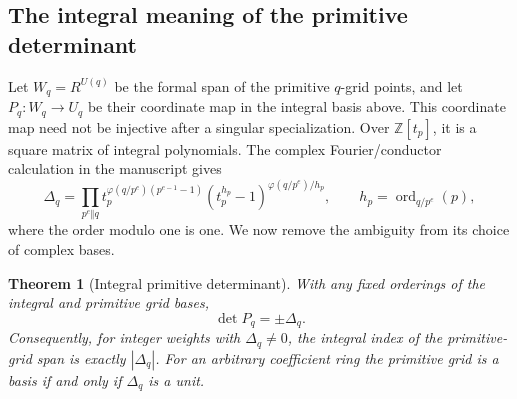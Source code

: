\documentclass[11pt,a4paper]{article}
\numberwithin{equation}{section}
\theoremstyle{plain}
\newtheorem{theorem}{Theorem}[section]
\theoremstyle{definition}
\theoremstyle{remark}
\begin{document}
\subsection{The integral meaning of the primitive determinant}

Let $W_q=R^{U(q)}$ be the formal span of the primitive $q$-grid points,
and let $P_q:W_q\to U_q$ be their coordinate map in the integral basis
above. This coordinate map need not be injective after a singular
specialization. Over $\mathbb Z[t_p]$, it is a square matrix of integral
polynomials. The complex Fourier/conductor calculation in the
manuscript gives
\[
 \Delta_q=\prod_{p^e\Vert q}
 t_p^{\varphi(q/p^e)(p^{e-1}-1)}
 (t_p^{h_p}-1)^{\varphi(q/p^e)/h_p},
 \qquad h_p=\operatorname{ord}_{q/p^e}(p),
\]
where the order modulo one is one. We now remove the ambiguity from
its choice of complex bases.

\begin{theorem}[Integral primitive determinant]
\label{intdist:thm:determinant}
With any fixed orderings of the integral and primitive grid bases,
\begin{equation}\label{intdist:eq:determinant}
 \det P_q=\pm\Delta_q.
\end{equation}
Consequently, for integer weights with $\Delta_q\ne0$, the integral
index of the primitive-grid span is exactly $|\Delta_q|$. For an
arbitrary coefficient ring the primitive grid is a basis if and only
if $\Delta_q$ is a unit.
\end{theorem}
\end{document}
